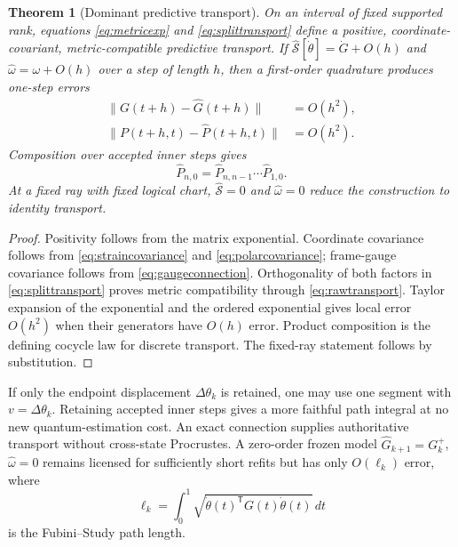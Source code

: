 \documentclass[10pt,twocolumn]{article}
\newtheorem{theorem}{Theorem}[section]
\theoremstyle{definition}
\theoremstyle{remark}
\begin{document}
\begin{theorem}[Dominant predictive transport]
On an interval of fixed supported rank, equations \eqref{eq:metricexp} and \eqref{eq:splittransport} define a positive, coordinate-covariant, metric-compatible predictive transport.  If $\widehat{\mathcal S}[\dot\theta]=\dot G+O(h)$ and $\widehat\omega=\omega+O(h)$ over a step of length $h$, then a first-order quadrature produces one-step errors
\begin{align}
 \|G(t+h)-\widehat G(t+h)\|&=O(h^2),\nonumber\\
 \|P(t+h,t)-\widehat P(t+h,t)\|&=O(h^2).
 \label{eq:localorder}
\end{align}
Composition over accepted inner steps gives
\begin{equation}
 \widehat P_{n,0}=\widehat P_{n,n-1}\cdots\widehat P_{1,0}.
 \label{eq:composition}
\end{equation}
At a fixed ray with fixed logical chart, $\widehat{\mathcal S}=0$ and $\widehat\omega=0$ reduce the construction to identity transport.
\end{theorem}

\begin{proof}
Positivity follows from the matrix exponential.  Coordinate covariance follows from \eqref{eq:straincovariance} and \eqref{eq:polarcovariance}; frame-gauge covariance follows from \eqref{eq:gaugeconnection}.  Orthogonality of both factors in \eqref{eq:splittransport} proves metric compatibility through \eqref{eq:rawtransport}.  Taylor expansion of the exponential and the ordered exponential gives local error $O(h^2)$ when their generators have $O(h)$ error.  Product composition is the defining cocycle law for discrete transport.  The fixed-ray statement follows by substitution.
\end{proof}

If only the endpoint displacement $\Delta\theta_k$ is retained, one may use one segment with $v=\Delta\theta_k$.  Retaining accepted inner steps gives a more faithful path integral at no new quantum-estimation cost.  An exact connection supplies authoritative transport without cross-state Procrustes.  A zero-order frozen model $\widehat G_{k+1}=G_k^+$, $\widehat\omega=0$ remains licensed for sufficiently short refits but has only $O(\ell_k)$ error, where
\begin{equation}
 \ell_k=\int_0^1\sqrt{\dot\theta(t)^{\mathsf T}G(t)\dot\theta(t)}\,dt
 \label{eq:pathlength}
\end{equation}
is the Fubini--Study path length.
\end{document}
